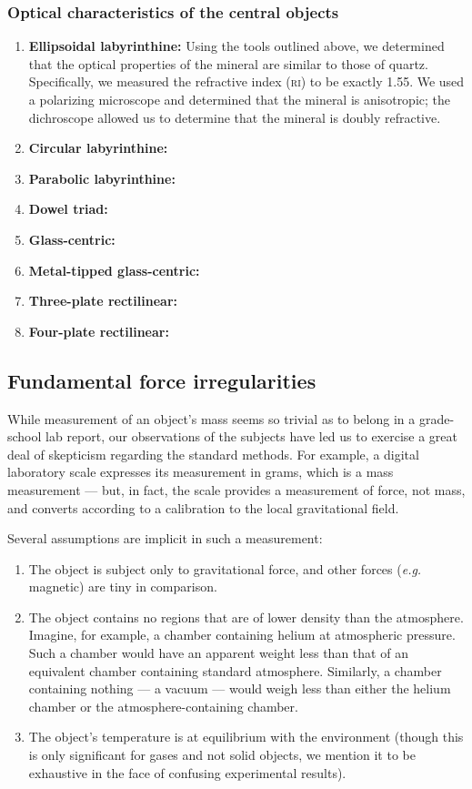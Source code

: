 \documentclass[10pt]{article}
\theoremstyle{definition}
\begin{document}
\subsubsection{Optical characteristics of the central objects}
\begin{enumerate}[(001)]
\item \textbf{Ellipsoidal labyrinthine:} Using the tools outlined above, we determined that the optical properties of the mineral are similar to those of quartz.
    Specifically, we measured the refractive index (\textsc{ri}) to be exactly 1.55.
    We used a polarizing microscope and determined that the mineral is anisotropic; the dichroscope allowed us to determine that the mineral is doubly refractive.
\item \textbf{Circular labyrinthine:}
\item \textbf{Parabolic labyrinthine:}
\item \textbf{Dowel triad:}
\item \textbf{Glass-centric:}
\item \textbf{Metal-tipped glass-centric:}
\item \textbf{Three-plate rectilinear:}
\item \textbf{Four-plate rectilinear:}
\end{enumerate}

\subsection{Fundamental force irregularities}
While measurement of an object's mass seems so trivial as to belong in a grade-school lab report, our observations of the subjects have led us to exercise a great deal of skepticism regarding the standard methods.
For example, a digital laboratory scale expresses its measurement in grams, which is a mass measurement --- but, in fact, the scale provides a measurement of force, not mass, and converts according to a calibration to the local gravitational field.

Several assumptions are implicit in such a measurement:
\begin{enumerate}
\item The object is subject only to gravitational force, and other forces (\textit{e.g.} magnetic) are tiny in comparison.
\item The object contains no regions that are of lower density than the atmosphere. Imagine, for example, a chamber containing helium at atmospheric pressure. Such a chamber would have an apparent weight less than that of an equivalent chamber containing standard atmosphere. Similarly, a chamber containing nothing --- a vacuum --- would weigh less than either the helium chamber or the atmosphere-containing chamber.
\item The object's temperature is at equilibrium with the environment (though this is only significant for gases and not solid objects, we mention it to be exhaustive in the face of confusing experimental results).
\end{enumerate}
\end{document}
